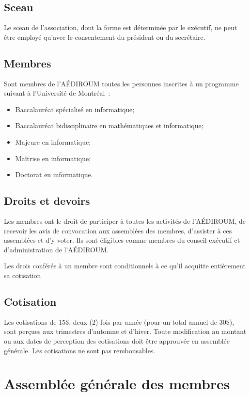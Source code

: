 \documentclass{aediroum}
\begin{document}
\subsection{Sceau}\label{sec:sceau}
Le sceau de l'association, dont la forme est déterminée par le  exécutif, ne peut être employé qu'avec le consentement du président ou du secrétaire.

\subsection{Membres}\label{sec:membres}
Sont membres de l'AÉDIROUM toutes les personnes inscrites à un programme suivant à l'Université de Montréal~:
\begin{itemize}
\item Baccalauréat spécialisé en informatique;
\item Baccalauréat bidisciplinaire en mathématiques et informatique;
\item Majeure en informatique;
\item Maîtrise en informatique;
\item Doctorat en informatique.
\end{itemize}

\subsection{Droits et devoirs}\label{sec:droits-et-devoirs}

Les membres ont le droit de participer à toutes les activités de l'AÉDIROUM, de recevoir les avis de convocation aux assemblées des membres, d'assister à ces assemblées et d'y voter. Ils sont éligibles comme membres du conseil exécutif et d'administration de l'AÉDIROUM.

Les drois conférés à un membre sont conditionnels à ce qu'il acquitte entièrement sa cotisation

\subsection{Cotisation}\label{sec:cotisation}

Les cotisations de 15\$, deux (2) fois par année (pour un total annuel de 30\$), sont perçues aux trimestres d'automne et d'hiver. Toute modification au montant ou aux dates de perception des cotisations doit être approuvée en assemblée générale. Les cotisations ne sont pas rembousables.

\section{Assemblée générale des membres}\label{sec:assemblee-generale-des-membres}
\end{document}
